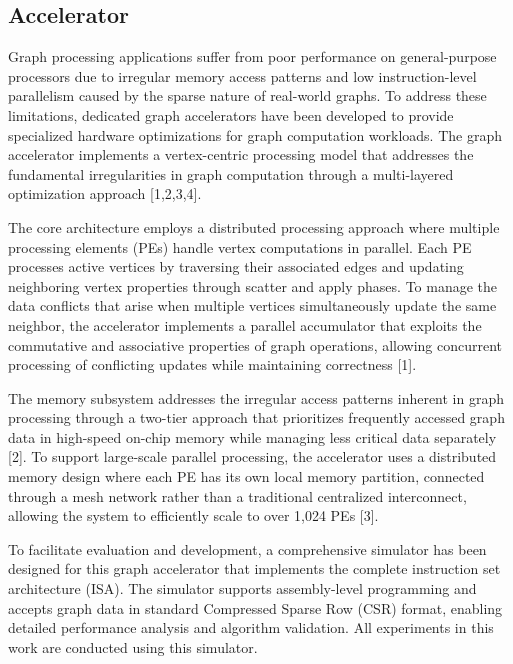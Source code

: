 \subsection{Accelerator}
Graph processing applications suffer from poor performance on general-purpose processors due to irregular memory access patterns 
and low instruction-level parallelism caused by the sparse nature of real-world graphs. 
To address these limitations, dedicated graph accelerators have been developed to provide specialized hardware optimizations for graph computation workloads. 
The graph accelerator implements a vertex-centric processing model that addresses the fundamental irregularities in graph computation 
through a multi-layered optimization approach [1,2,3,4].

The core architecture employs a distributed processing approach where multiple processing elements (PEs) handle vertex computations in parallel. 
Each PE processes active vertices by traversing their associated edges and updating neighboring vertex properties through scatter and apply phases. 
To manage the data conflicts that arise when multiple vertices simultaneously update the same neighbor, 
the accelerator implements a parallel accumulator that exploits the commutative and associative properties of graph operations, 
allowing concurrent processing of conflicting updates while maintaining correctness [1].

The memory subsystem addresses the irregular access patterns inherent in graph processing through a two-tier approach 
that prioritizes frequently accessed graph data in high-speed on-chip memory while managing less critical data separately [2]. 
To support large-scale parallel processing, the accelerator uses a distributed memory design where each PE has its own local memory partition, 
connected through a mesh network rather than a traditional centralized interconnect, allowing the system to efficiently scale to over 1,024 PEs [3].

To facilitate evaluation and development, 
a comprehensive simulator has been designed for this graph accelerator that implements the complete instruction set architecture (ISA). 
The simulator supports assembly-level programming and accepts graph data in standard Compressed Sparse Row (CSR) format, 
enabling detailed performance analysis and algorithm validation. All experiments in this work are conducted using this simulator.